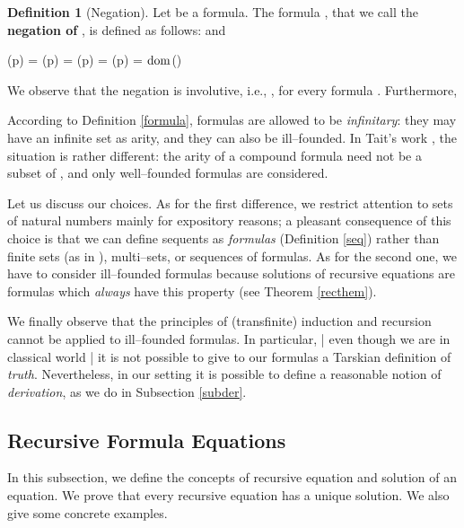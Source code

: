 \documentclass[copyright,creativecommons]{eptcs}
\def\ie{i.e., }
\newcommand{\bF}{\mathbf{F}}
\newcommand{\bbv}{\mathbf{v}}
\newcommand{\dom}{\ensuremath{\textnormal{dom}}}
\theoremstyle{definition}
\newtheorem{Definition}[theorem]{Definition}
\newcommand{\squishlist}{
 \begin{list}{}
  { \setlength{\itemsep}{0pt}
     \setlength{\parsep}{3pt}
     \setlength{\topsep}{3pt}
     \setlength{\partopsep}{0pt}
     \setlength{\leftmargin}{1em}
     \setlength{\labelwidth}{1.5em}
     \setlength{\labelsep}{0.5em} } }
\newcommand{\squishend}{
  \end{list}  }
\begin{document}
 \begin{Definition}[Negation]
 Let  be a formula.
 The formula , that we call
 the \textbf{negation of} , is defined
 as follows:
 and

\squishlist
\item[]
{\centering
 {\bF}(p) = \bbv{\bF}(p) = \neg \bbv{\bF}(p) = \wedge{\bF}(p) = \veep \in \dom(\neg\bF)

\vspace{-0.55cm}
\hfill \par}
\squishend


 \end{Definition}
 We observe that the negation is involutive, \ie
, for every formula . Furthermore,
\squishlist
\item[] 
\squishend




 According to Definition \ref{formula},
 formulas are allowed to  be  \emph{infinitary}:
they  may have an infinite set  as  arity, and they  can also be ill--founded. In
Tait's work \cite{Tait68},  the situation is rather different:
 the arity of a compound  formula
 need not  be a subset of , and  only
well--founded formulas are  considered.

Let us  discuss our choices.
As for the first difference,
we restrict  attention to sets of natural numbers mainly for expository reasons; a pleasant  consequence of
this choice is
 that we can define  sequents as \emph{formulas}  (Definition \ref{seq})
rather than finite sets (as  in \cite{Tait68}),
multi--sets, or sequences of  formulas.
As for the second one, we have to  consider ill--founded
formulas because   solutions of   recursive equations
are formulas which \emph{always}   have this property (see Theorem \ref{recthem}).

We finally observe that
the principles of (transfinite)
induction and recursion cannot be applied to
ill--founded
formulas.  In particular, | even though we are in classical world | it is not possible to give to our formulas
a Tarskian definition of \emph{truth}. Nevertheless, in our setting it is possible to
define a reasonable notion of \emph{derivation}, as we do  in
 Subsection  \ref{subder}.

 \subsection{Recursive Formula Equations} \label{receqsec}
In this subsection, we  define the concepts of recursive equation and solution of an equation. We
 prove  that every recursive equation
has a unique solution. We also give some concrete examples.
\end{document}
